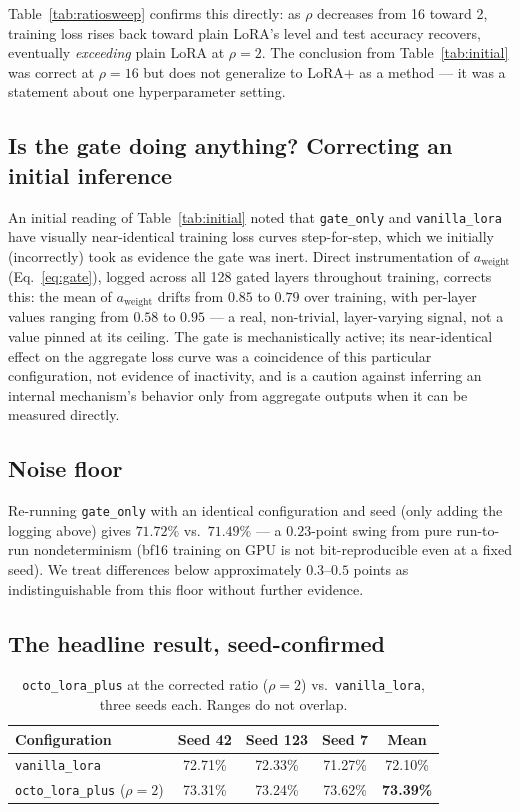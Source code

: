 \documentclass[11pt]{article}
\begin{document}
Table~\ref{tab:ratiosweep} confirms this directly: as $\rho$ decreases from
16 toward 2, training loss rises back toward plain LoRA's level and test
accuracy recovers, eventually \emph{exceeding} plain LoRA at $\rho=2$. The
conclusion from Table~\ref{tab:initial} was correct at $\rho=16$ but does
not generalize to LoRA+ as a method — it was a statement about one
hyperparameter setting.

\subsection{Is the gate doing anything? Correcting an initial inference}

An initial reading of Table~\ref{tab:initial} noted that \texttt{gate\_only}
and \texttt{vanilla\_lora} have visually near-identical training loss
curves step-for-step, which we initially (incorrectly) took as evidence
the gate was inert. Direct instrumentation of $a_{\text{weight}}$
(Eq.~\ref{eq:gate}), logged across all 128 gated layers throughout
training, corrects this: the mean of $a_{\text{weight}}$ drifts from
$0.85$ to $0.79$ over training, with per-layer values ranging from $0.58$
to $0.95$ — a real, non-trivial, layer-varying signal, not a value pinned
at its ceiling. The gate is mechanistically active; its near-identical
effect on the aggregate loss curve was a coincidence of this particular
configuration, not evidence of inactivity, and is a caution against
inferring an internal mechanism's behavior only from aggregate outputs
when it can be measured directly.

\subsection{Noise floor}
\label{sec:noise}

Re-running \texttt{gate\_only} with an identical configuration and seed
(only adding the logging above) gives $71.72\%$ vs.\ $71.49\%$ — a
$0.23$-point swing from pure run-to-run nondeterminism (bf16 training on
GPU is not bit-reproducible even at a fixed seed). We treat differences
below approximately $0.3$--$0.5$ points as indistinguishable from this
floor without further evidence.

\subsection{The headline result, seed-confirmed}

\begin{table}[t]
\centering
\caption{\texttt{octo\_lora\_plus} at the corrected ratio ($\rho{=}2$) vs.\
\texttt{vanilla\_lora}, three seeds each. Ranges do not overlap.}
\label{tab:seeds}
\begin{tabular}{lcccc}
\toprule
Configuration & Seed 42 & Seed 123 & Seed 7 & Mean \\
\midrule
\texttt{vanilla\_lora} & 72.71\% & 72.33\% & 71.27\% & 72.10\% \\
\texttt{octo\_lora\_plus} ($\rho{=}2$) & 73.31\% & 73.24\% & 73.62\% & \textbf{73.39\%} \\
\bottomrule
\end{tabular}
\end{table}
\end{document}
